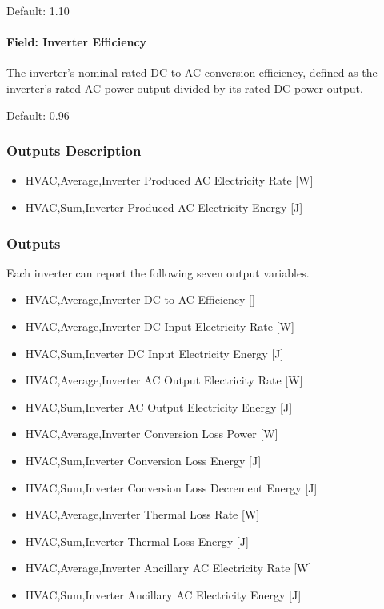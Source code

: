 Default: 1.10

\paragraph{Field: Inverter Efficiency}\label{field-inverter-efficiency-electricloadcenterinverterpvwatts}

The inverter's nominal rated DC-to-AC conversion efficiency, defined as
the inverter's rated AC power output divided by its rated DC power
output.

Default: 0.96

\subsubsection{Outputs Description}\label{outputs-description-electricloadcenterinverterpvwatts}

\begin{itemize}
\item
  HVAC,Average,Inverter Produced AC Electricity Rate {[}W{]}
\item
  HVAC,Sum,Inverter Produced AC Electricity Energy {[}J{]}
\end{itemize}

\subsubsection{Outputs}\label{outputs-3-005}

Each inverter can report the following seven output variables.

\begin{itemize}
\tightlist
\item
  HVAC,Average,Inverter DC to AC Efficiency {[]}
\item
  HVAC,Average,Inverter DC Input Electricity Rate {[}W{]}
\item
  HVAC,Sum,Inverter DC Input Electricity Energy {[}J{]}
\item
  HVAC,Average,Inverter AC Output Electricity Rate {[}W{]}
\item
  HVAC,Sum,Inverter AC Output Electricity Energy {[}J{]}
\item
  HVAC,Average,Inverter Conversion Loss Power {[}W{]}
\item
  HVAC,Sum,Inverter Conversion Loss Energy {[}J{]}
\item
  HVAC,Sum,Inverter Conversion Loss Decrement Energy {[}J{]}
\item
  HVAC,Average,Inverter Thermal Loss Rate {[}W{]}
\item
  HVAC,Sum,Inverter Thermal Loss Energy {[}J{]}
\item
  HVAC,Average,Inverter Ancillary AC Electricity Rate {[}W{]}
\item
  HVAC,Sum,Inverter Ancillary AC Electricity Energy {[}J{]}
\end{itemize}

